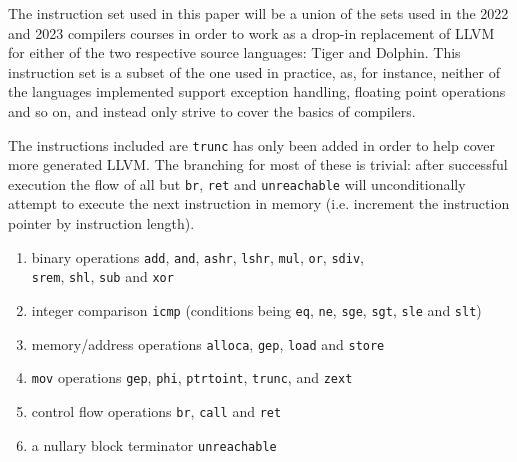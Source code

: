 \documentclass{article}
\begin{document}
The instruction set used in this paper will be a union of the sets used in the 2022 and 2023 compilers courses in order to work as a drop-in replacement of LLVM for either of the two respective source languages:  Tiger and Dolphin. This instruction set is a subset of the one used in practice, as, for instance, neither of the languages implemented support exception handling, floating point operations and so on, and instead only strive to cover the basics of compilers.

The instructions included are
\lstinline!trunc! has only been added in order to help cover more generated LLVM. %
The branching for most of these is trivial: after successful execution the flow of all but \lstinline!br!, \lstinline!ret! and \lstinline!unreachable! will unconditionally attempt to execute the next instruction in memory (i.e. increment the instruction pointer by instruction length).


\label{appendix:llvmis}
\begin{enumerate}
    \item binary operations \lstinline!add!, \lstinline!and!, \lstinline!ashr!, \lstinline!lshr!, \lstinline!mul!, \lstinline!or!, \lstinline!sdiv!,\\\lstinline!srem!, \lstinline!shl!, \lstinline!sub! and \lstinline!xor!
    \item integer comparison \lstinline!icmp! (conditions being \lstinline!eq!, \lstinline!ne!, \lstinline!sge!, \lstinline!sgt!, \lstinline!sle! and \lstinline!slt!)
    \item memory/address operations \lstinline!alloca!, \lstinline!gep!, \lstinline!load! and \lstinline!store!
    \item  \lstinline!mov! operations \lstinline!gep!, \lstinline!phi!, \lstinline!ptrtoint!, \lstinline!trunc!, and \lstinline!zext!
    \item control flow operations \lstinline!br!, \lstinline!call! and \lstinline!ret!
    \item a  nullary block terminator \lstinline!unreachable!
\end{enumerate}
\end{document}
